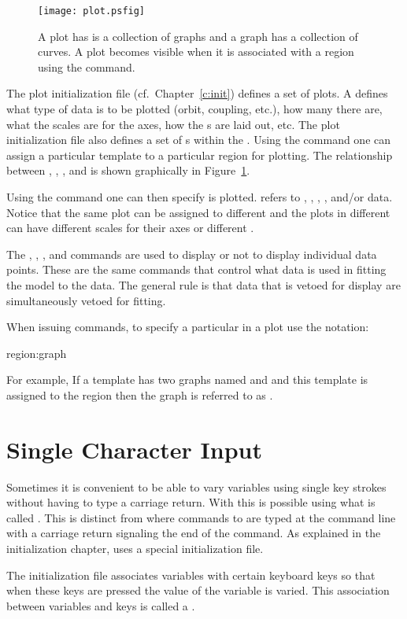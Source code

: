 \begin{figure}
  \centering
  \texttt{[image: plot.psfig]}
  \caption{A plot has is a collection of graphs and a graph has a 
collection of curves. A plot becomes visible when it 
is associated with a region using the  command.}
  \label{f:plot}
\end{figure}

The plot initialization file (cf.~Chapter~\ref{c:init}) defines a set
of  plots. A  defines what type of data is
to be plotted (orbit, coupling, etc.), how many  there are,
what the scales are for the  axes, how the s are
laid out, etc.  The plot initialization file also defines a set of
s within the .  Using the  command one
can assign a particular template to a particular region for plotting.
The relationship between , , , and
 is shown graphically in Figure~\ref{f:plot}.

Using the  command one can then specify  is
plotted.  refers to , , ,
, and/or  data.  Notice that the same 
plot can be assigned to different  and the plots in different
 can have different scales for their axes or different
.


The , , ,
and  commands are used to display or not to display
individual data points. These are the same commands that control what
data is used in fitting the model to the data. The general rule is
that data that is vetoed for display are simultaneously vetoed for fitting.

When issuing \tao commands, to specify a particular  in a plot
use the notation:
\begin{example}
  region:graph
\end{example}
For example, If a template has two graphs named  and  and
this template is assigned to the  region then the  graph
is referred to as . 

\section{Single Character Input}

Sometimes it is convenient to be able to vary variables using single key strokes
without having to type a carriage return.
With \tao this is possible using what is called . This is distinct from
 where commands to \tao are typed at the command line with a carriage 
return signaling the end of the command. As explained in the initialization chapter,
 uses a special initialization file.

The  initialization file associates variables with certain keyboard keys
so that when these keys are pressed the value of the variable is varied. This association
between variables and keys is called a .

